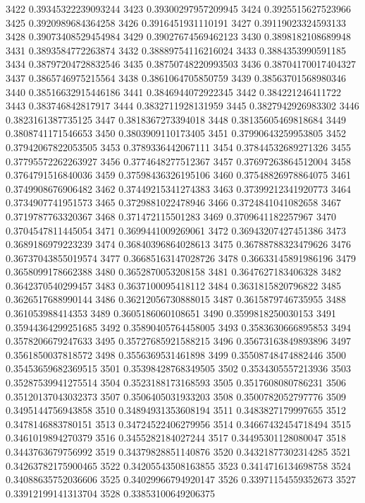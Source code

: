 3422 0.39345322239093244
3423 0.39300297957209945
3424 0.3925515627523966
3425 0.3920989684364258
3426 0.3916451931110191
3427 0.39119023324593133
3428 0.39073408529454984
3429 0.39027674569462123
3430 0.3898182108689948
3431 0.3893584772263874
3432 0.38889754116216024
3433 0.3884353990591185
3434 0.38797204728832546
3435 0.38750748220993503
3436 0.38704170017404327
3437 0.3865746975215564
3438 0.3861064705850759
3439 0.38563701568980346
3440 0.38516632915446186
3441 0.3846944072922345
3442 0.384221246411722
3443 0.383746842817917
3444 0.3832711928131959
3445 0.3827942926983302
3446 0.3823161387735125
3447 0.3818367273394018
3448 0.38135605469818684
3449 0.3808741171546653
3450 0.3803909110173405
3451 0.37990643259953805
3452 0.37942067822053505
3453 0.3789336442067111
3454 0.37844532689271326
3455 0.37795572262263927
3456 0.3774648277512367
3457 0.37697263864512004
3458 0.3764791516840036
3459 0.37598436326195106
3460 0.37548826978864075
3461 0.3749908676906482
3462 0.37449215341274383
3463 0.37399212341920773
3464 0.3734907741951573
3465 0.3729881022478946
3466 0.3724841041082658
3467 0.3719787763320367
3468 0.371472115501283
3469 0.3709641182257967
3470 0.3704547811445054
3471 0.3699441009269061
3472 0.36943207427451386
3473 0.3689186979223239
3474 0.36840396864028613
3475 0.36788788323479626
3476 0.36737043855019574
3477 0.36685163147028726
3478 0.36633145891986196
3479 0.3658099178662388
3480 0.3652870053208158
3481 0.3647627183406328
3482 0.3642370540299457
3483 0.3637100095418112
3484 0.3631815820796822
3485 0.3626517688990144
3486 0.36212056730888015
3487 0.3615879746735955
3488 0.361053988414353
3489 0.3605186060108651
3490 0.3599818250030153
3491 0.35944364299251685
3492 0.35890405764458005
3493 0.3583630666895853
3494 0.3578206679247633
3495 0.35727685921588215
3496 0.35673163849893896
3497 0.3561850037818572
3498 0.3556369531461898
3499 0.35508748474882446
3500 0.35453659682369515
3501 0.35398428768349505
3502 0.3534305557213936
3503 0.35287539941275514
3504 0.3523188173168593
3505 0.3517608080786231
3506 0.35120137043032373
3507 0.3506405031933203
3508 0.3500782052797776
3509 0.3495144756943858
3510 0.34894931353608194
3511 0.3483827179997655
3512 0.3478146883780151
3513 0.34724522406279956
3514 0.34667432454718494
3515 0.3461019894270379
3516 0.3455282184027244
3517 0.34495301128080047
3518 0.3443763679756992
3519 0.34379828851140876
3520 0.34321877302314285
3521 0.34263782175900465
3522 0.34205543508163855
3523 0.3414716134698758
3524 0.34088635752036606
3525 0.34029966794920147
3526 0.33971154559352673
3527 0.33912199141313704
3528 0.33853100649206375
